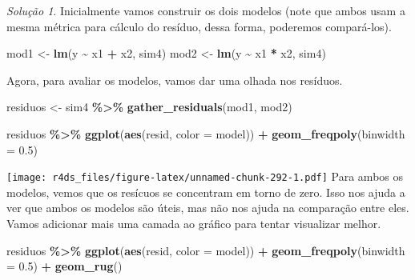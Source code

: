 \documentclass[
]{latex/krantz}
\newenvironment{Shaded}{\begin{snugshade}}{\end{snugshade}}
\newcommand{\AttributeTok}[1]{\textcolor[rgb]{0.13,0.29,0.53}{#1}}
\newcommand{\FloatTok}[1]{\textcolor[rgb]{0.00,0.00,0.81}{#1}}
\newcommand{\FunctionTok}[1]{\textcolor[rgb]{0.13,0.29,0.53}{\textbf{#1}}}
\newcommand{\NormalTok}[1]{#1}
\newcommand{\OtherTok}[1]{\textcolor[rgb]{0.56,0.35,0.01}{#1}}
\newcommand{\SpecialCharTok}[1]{\textcolor[rgb]{0.81,0.36,0.00}{\textbf{#1}}}
\theoremstyle{definition}
\theoremstyle{definition}
\theoremstyle{definition}
\theoremstyle{definition}
\theoremstyle{remark}
\newtheorem*{solution}{Solução}
\begin{document}
\begin{solution}
Inicialmente vamos construir os dois modelos (note que ambos usam a mesma métrica para cálculo do resíduo, dessa forma, poderemos compará-los).

\begin{Shaded}
\begin{Highlighting}[]
\NormalTok{mod1 }\OtherTok{\textless{}{-}} \FunctionTok{lm}\NormalTok{(y }\SpecialCharTok{\textasciitilde{}}\NormalTok{ x1 }\SpecialCharTok{+}\NormalTok{ x2, sim4)}
\NormalTok{mod2 }\OtherTok{\textless{}{-}} \FunctionTok{lm}\NormalTok{(y }\SpecialCharTok{\textasciitilde{}}\NormalTok{ x1 }\SpecialCharTok{*}\NormalTok{ x2, sim4)}
\end{Highlighting}
\end{Shaded}

Agora, para avaliar os modelos, vamos dar uma olhada nos resíduos.

\begin{Shaded}
\begin{Highlighting}[]
\NormalTok{residuos }\OtherTok{\textless{}{-}}\NormalTok{ sim4 }\SpecialCharTok{\%\textgreater{}\%}
              \FunctionTok{gather\_residuals}\NormalTok{(mod1, mod2)}

\NormalTok{residuos }\SpecialCharTok{\%\textgreater{}\%}
  \FunctionTok{ggplot}\NormalTok{(}\FunctionTok{aes}\NormalTok{(resid, }\AttributeTok{color =}\NormalTok{ model)) }\SpecialCharTok{+}
    \FunctionTok{geom\_freqpoly}\NormalTok{(}\AttributeTok{binwidth =} \FloatTok{0.5}\NormalTok{)}
\end{Highlighting}
\end{Shaded}

\texttt{[image: r4ds\_files/figure-latex/unnamed-chunk-292-1.pdf]}
Para ambos os modelos, vemos que os resícuos se concentram em torno de zero. Isso nos ajuda a ver que ambos os modelos são úteis, mas não nos ajuda na comparação entre eles. Vamos adicionar mais uma camada ao gráfico para tentar visualizar melhor.

\begin{Shaded}
\begin{Highlighting}[]
\NormalTok{residuos }\SpecialCharTok{\%\textgreater{}\%}
  \FunctionTok{ggplot}\NormalTok{(}\FunctionTok{aes}\NormalTok{(resid, }\AttributeTok{color =}\NormalTok{ model)) }\SpecialCharTok{+}
    \FunctionTok{geom\_freqpoly}\NormalTok{(}\AttributeTok{binwidth =} \FloatTok{0.5}\NormalTok{) }\SpecialCharTok{+}
    \FunctionTok{geom\_rug}\NormalTok{()}
\end{Highlighting}
\end{Shaded}


\end{solution}
\end{document}
